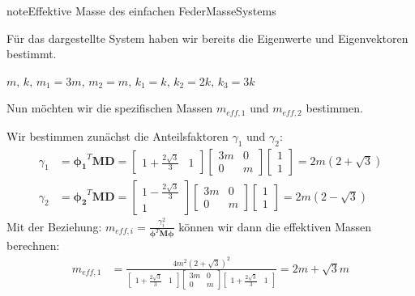 \documentclass[letterpaper,10pt,german]{jupyterBook}
\begin{document}
\begin{sphinxadmonition}{note}{Effektive Masse des einfachen Feder\sphinxhyphen{}Masse\sphinxhyphen{}Systems}

\sphinxAtStartPar
Für das dargestellte System haben wir bereits die Eigenwerte und Eigenvektoren bestimmt.

\sphinxAtStartPar
{} \(m,\,k,\,m_1=3m,\,m_2=m,\,k_1=k,\,k_2=2k,\,k_3=3k\)

\sphinxAtStartPar
{}

\sphinxAtStartPar
Nun möchten wir die spezifischen Massen \(m_{eff,1}\) und \(m_{eff,2}\) bestimmen.

\sphinxAtStartPar
{}

\sphinxAtStartPar
Wir bestimmen zunächst die Anteilsfaktoren \(\gamma_1\) und \(\gamma_2\):
\begin{align*}
\gamma_1 &= \bm{\phi_1}^T \bm{M} \bm{D} =  \begin{bmatrix}1 + \frac{2 \sqrt{3}}{3}& 1\end{bmatrix} \left[\begin{matrix}3 m & 0\\0 & m\end{matrix}\right]  \begin{bmatrix} 1 \\ 1\end{bmatrix} = 2 m \left(2+ \sqrt{3}  \right)\\
\gamma_2 &= \bm{\phi_2}^T \bm{M} \bm{D} =  \begin{bmatrix}1 - \frac{2 \sqrt{3}}{3}\\1\end{bmatrix} \left[\begin{matrix}3 m & 0\\0 & m\end{matrix}\right]  \begin{bmatrix} 1 \\ 1\end{bmatrix} = 2 m \left(2 - \sqrt{3}\right)
\end{align*}
\sphinxAtStartPar
Mit der Beziehung: \(m_{eff,i} = \frac{\gamma_i^2}{\bm{\phi}^T\bm{M}\bm{\phi}}\) können wir dann die effektiven Massen berechnen:
\begin{align*}
m_{eff,1} &= \frac{4 m^2 \left(2+ \sqrt{3}  \right)^2}{\begin{bmatrix}1 + \frac{2 \sqrt{3}}{3}& 1\end{bmatrix} \left[\begin{matrix}3 m & 0\\0 & m\end{matrix}\right] \begin{bmatrix}1 + \frac{2 \sqrt{3}}{3}& 1\end{bmatrix}} = 2 m + \sqrt{3} m 

\end{align*}
\end{sphinxadmonition}
\end{document}

